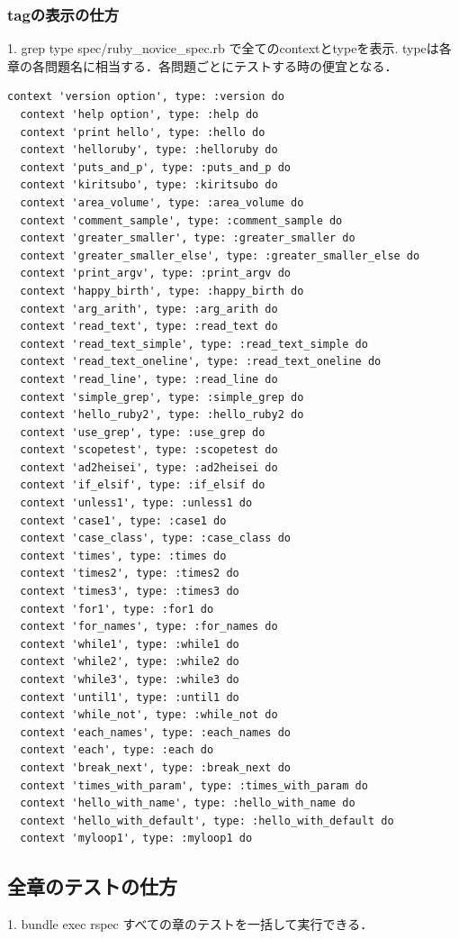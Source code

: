 \subsubsection{tagの表示の仕方}
1. grep type spec/ruby\_novice\_spec.rb  で全てのcontextとtypeを表示.
typeは各章の各問題名に相当する．各問題ごとにテストする時の便宜となる．
\begin{lstlisting}[style=customRuby]
  context 'version option', type: :version do
  context 'help option', type: :help do
  context 'print hello', type: :hello do
  context 'helloruby', type: :helloruby do
  context 'puts_and_p', type: :puts_and_p do
  context 'kiritsubo', type: :kiritsubo do
  context 'area_volume', type: :area_volume do
  context 'comment_sample', type: :comment_sample do
  context 'greater_smaller', type: :greater_smaller do
  context 'greater_smaller_else', type: :greater_smaller_else do
  context 'print_argv', type: :print_argv do
  context 'happy_birth', type: :happy_birth do
  context 'arg_arith', type: :arg_arith do
  context 'read_text', type: :read_text do
  context 'read_text_simple', type: :read_text_simple do
  context 'read_text_oneline', type: :read_text_oneline do
  context 'read_line', type: :read_line do
  context 'simple_grep', type: :simple_grep do
  context 'hello_ruby2', type: :hello_ruby2 do
  context 'use_grep', type: :use_grep do
  context 'scopetest', type: :scopetest do
  context 'ad2heisei', type: :ad2heisei do
  context 'if_elsif', type: :if_elsif do
  context 'unless1', type: :unless1 do
  context 'case1', type: :case1 do
  context 'case_class', type: :case_class do
  context 'times', type: :times do
  context 'times2', type: :times2 do
  context 'times3', type: :times3 do
  context 'for1', type: :for1 do
  context 'for_names', type: :for_names do
  context 'while1', type: :while1 do
  context 'while2', type: :while2 do
  context 'while3', type: :while3 do
  context 'until1', type: :until1 do
  context 'while_not', type: :while_not do
  context 'each_names', type: :each_names do
  context 'each', type: :each do
  context 'break_next', type: :break_next do
  context 'times_with_param', type: :times_with_param do
  context 'hello_with_name', type: :hello_with_name do
  context 'hello_with_default', type: :hello_with_default do
  context 'myloop1', type: :myloop1 do
\end{lstlisting}
\subsection{全章のテストの仕方}
1. bundle exec rspec
すべての章のテストを一括して実行できる．

